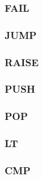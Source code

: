 \subsubsection{FAIL}

\subsubsection{JUMP}

\subsubsection{RAISE}

\subsubsection{PUSH}

\subsubsection{POP}

\subsubsection{LT}

\subsubsection{CMP}
